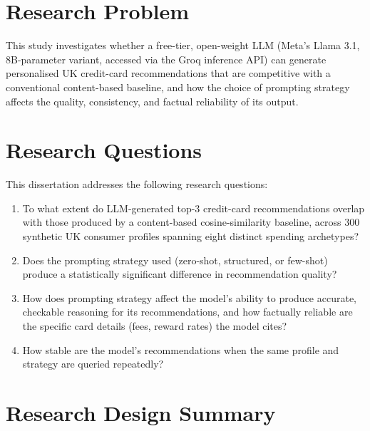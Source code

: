 \section{Research Problem}

This study investigates whether a free-tier, open-weight LLM (Meta's Llama 3.1, 8B-parameter variant, accessed via the Groq inference API) can generate personalised UK credit-card recommendations that are competitive with a conventional content-based baseline, and how the choice of prompting strategy affects the quality, consistency, and factual reliability of its output.

\section{Research Questions}

This dissertation addresses the following research questions:

\begin{enumerate}
    \item To what extent do LLM-generated top-3 credit-card recommendations overlap with those produced by a content-based cosine-similarity baseline, across 300 synthetic UK consumer profiles spanning eight distinct spending archetypes?
    \item Does the prompting strategy used (zero-shot, structured, or few-shot) produce a statistically significant difference in recommendation quality?
    \item How does prompting strategy affect the model's ability to produce accurate, checkable reasoning for its recommendations, and how factually reliable are the specific card details (fees, reward rates) the model cites?
    \item How stable are the model's recommendations when the same profile and strategy are queried repeatedly?
\end{enumerate}

\section{Research Design Summary}

